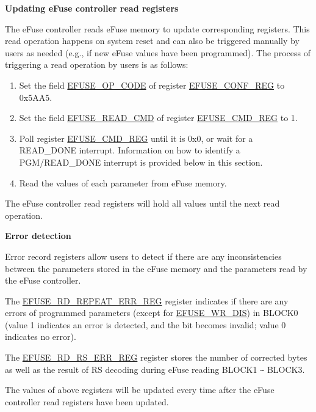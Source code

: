 \documentclass[main\_\_EN.tex]{subfiles}
\begin{document}



{\bfseries Updating eFuse controller read registers}
\label{sec:efuse-update-reg}

The eFuse controller reads eFuse memory to update corresponding registers. This read operation happens on system reset and can also be triggered manually by users as needed (e.g., if new eFuse values have been programmed). The process of triggering a read operation by users is as follows:

\begin{enumerate}
    \item Set the field \hyperref[fielddesc:EFUSEOPCODE]{EFUSE\_OP\_CODE} of register \hyperref[regdesc:EFUSECONFREG]{EFUSE\_CONF\_REG} to 0x5AA5.
    \item Set the field \hyperref[fielddesc:EFUSEREADCMD]{EFUSE\_READ\_CMD} of register \hyperref[regdesc:EFUSECMDREG]{EFUSE\_CMD\_REG} to 1.
    \item Poll register \hyperref[regdesc:EFUSECMDREG]{EFUSE\_CMD\_REG} until it is 0x0, or wait for a READ\_DONE interrupt. Information on how to identify a PGM/READ\_DONE interrupt is provided below in this section.
    \item Read the values of each parameter from eFuse memory.
\end{enumerate}

The eFuse controller read registers will hold all values until the next read operation.

{\bfseries Error detection}

Error record registers allow users to detect if there are any inconsistencies between the parameters stored in the eFuse memory and the parameters read by the eFuse controller.

The \hyperref[regdesc:EFUSERDREPEATERRREG]{EFUSE\_RD\_REPEAT\_ERR\_REG} register indicates if there are any errors of programmed parameters (except for \hyperref[fielddesc:EFUSEWRDIS]{EFUSE\_WR\_DIS}) in BLOCK0 (value 1 indicates an error is detected, and the bit becomes invalid; value 0 indicates no error).

The \hyperref[regdesc:EFUSERDRSERRREG]{EFUSE\_RD\_RS\_ERR\_REG} register stores the number of corrected bytes as well as the result of RS decoding during eFuse reading BLOCK1 \verb+~+ BLOCK3.

The values of above registers will be updated every time after the eFuse controller read registers have been updated.
\end{document}
